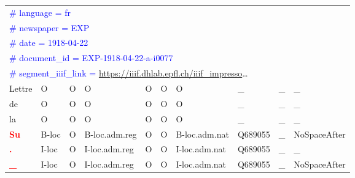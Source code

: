 \begin{table}
{\begin{tabular}{l|ll|lll|l|ll|l}
            \multicolumn{10}{l}{\textcolor{blue}{\# language = fr}}                                                                                                                                               \\
            \multicolumn{10}{l}{\textcolor{blue}{\# newspaper = EXP}}                                                                                                                                             \\
            \multicolumn{10}{l}{\textcolor{blue}{\# date = 1918-04-22}}                                                                                                                                           \\
            \multicolumn{10}{l}{\textcolor{blue}{\# document\_id = EXP-1918-04-22-a-i0077}}                                                                                                                       \\
            \multicolumn{10}{l}{\textcolor{blue}{\# segment\_iiif\_link = \url{https://iiif.dhlab.epfl.ch/iiif_impresso}}\dots}                                                                                   \\%
            Lettre                              & O                              & O                            & O             & O                        & O    & O             & \_      & \_   & \_           \\
            de                                  & O                              & O                            & O             & O                        & O    & O             & \_      & \_   & \_           \\
            la                                  & O                              & O                            & O             & O                        & O    & O             & \_      & \_   & \_           \\
            \textbf{\textcolor{red}{Su}}        & B-loc                          & O                            & B-loc.adm.reg & O                        & O    & B-loc.adm.nat & Q689055 & \_   & NoSpaceAfter \\
            \textbf{\textcolor{red}{.}}         & I-loc                          & O                            & I-loc.adm.reg & O                        & O    & I-loc.adm.nat & Q689055 & \_   & \_           \\
            \textbf{\textcolor{red}{\_}}        & I-loc                          & O                            & I-loc.adm.reg & O                        & O    & I-loc.adm.nat & Q689055 & \_   & NoSpaceAfter \\

\end{tabular}}
\end{table}
